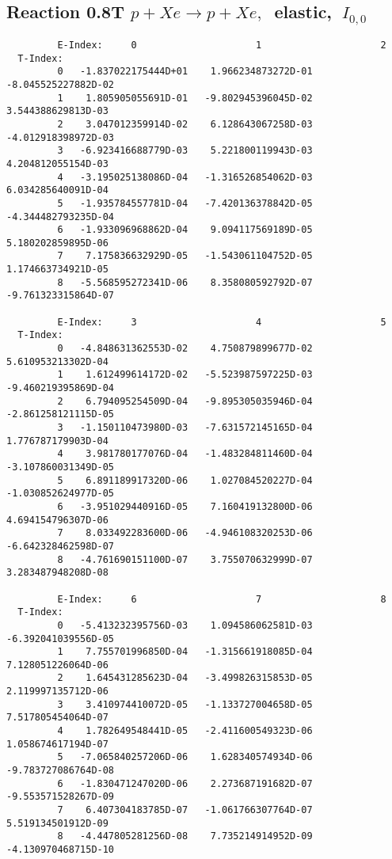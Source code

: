 \documentclass[12pt]{article}
\begin{document}
\subsection{
Reaction 0.8T  $p + Xe \rightarrow p + Xe ,\ $
 elastic, $\  I_{0,0}$
}

\begin{small}\begin{verbatim}
         E-Index:     0                     1                     2
  T-Index:
         0   -1.837022175444D+01    1.966234873272D-01   -8.045525227882D-02
         1    1.805905055691D-01   -9.802945396045D-02    3.544388629813D-03
         2    3.047012359914D-02    6.128643067258D-03   -4.012918398972D-03
         3   -6.923416688779D-03    5.221800119943D-03    4.204812055154D-03
         4   -3.195025138086D-04   -1.316526854062D-03    6.034285640091D-04
         5   -1.935784557781D-04   -7.420136378842D-05   -4.344482793235D-04
         6   -1.933096968862D-04    9.094117569189D-05    5.180202859895D-06
         7    7.175836632929D-05   -1.543061104752D-05    1.174663734921D-05
         8   -5.568595272341D-06    8.358080592792D-07   -9.761323315864D-07
 
         E-Index:     3                     4                     5
  T-Index:
         0   -4.848631362553D-02    4.750879899677D-02    5.610953213302D-04
         1    1.612499614172D-02   -5.523987597225D-03   -9.460219395869D-04
         2    6.794095254509D-04   -9.895305035946D-04   -2.861258121115D-05
         3   -1.150110473980D-03   -7.631572145165D-04    1.776787179903D-04
         4    3.981780177076D-04   -1.483284811460D-04   -3.107860031349D-05
         5    6.891189917320D-06    1.027084520227D-04   -1.030852624977D-05
         6   -3.951029440916D-05    7.160419132800D-06    4.694154796307D-06
         7    8.033492283600D-06   -4.946108320253D-06   -6.642328462598D-07
         8   -4.761690151100D-07    3.755070632999D-07    3.283487948208D-08
 
         E-Index:     6                     7                     8
  T-Index:
         0   -5.413232395756D-03    1.094586062581D-03   -6.392041039556D-05
         1    7.755701996850D-04   -1.315661918085D-04    7.128051226064D-06
         2    1.645431285623D-04   -3.499826315853D-05    2.119997135712D-06
         3    3.410974410072D-05   -1.133727004658D-05    7.517805454064D-07
         4    1.782649548441D-05   -2.411600549323D-06    1.058674617194D-07
         5   -7.065840257206D-06    1.628340574934D-06   -9.783727086764D-08
         6   -1.830471247020D-06    2.273687191682D-07   -9.553571528267D-09
         7    6.407304183785D-07   -1.061766307764D-07    5.519134501912D-09
         8   -4.447805281256D-08    7.735214914952D-09   -4.130970468715D-10
\end{verbatim}\end{small}
 
\end{document}
